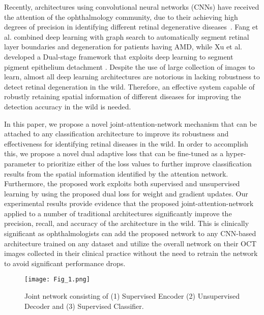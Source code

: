 \documentclass{article}
\begin{document}
Recently, architectures using convolutional neural networks (CNNs) have received the attention of the ophthalmology community, due to their achieving high degrees of precision in identifying different retinal degenerative diseases~\cite{lee2017deep}. Fang et al. combined deep learning with graph search to automatically segment retinal layer boundaries and degeneration for patients having AMD\cite{fang2017automatic}, while Xu et al. developed a Dual-stage framework that exploits deep learning to segment pigment epithelium detachment \cite{xu2017dual}. Despite the use of large collection of images to learn, almost all deep learning architectures are notorious in lacking robustness to detect retinal degeneration in the wild. Therefore, an effective system capable of robustly retaining spatial information of different diseases for improving the detection accuracy in the wild is needed. 

In this paper, we propose a novel joint-attention-network mechanism that can be attached to any classification architecture to improve its robustness and effectiveness for identifying retinal diseases in the wild. In order to accomplish this, we propose a novel dual adaptive loss that can be fine-tuned as a hyper-parameter to prioritize either of the loss values to further improve classification results from the spatial information identified by the attention network. Furthermore, the proposed work exploits both supervised and unsupervised learning by using the proposed dual loss for weight and gradient updates. Our experimental results provide evidence that the proposed joint-attention-network applied to a number of traditional architectures significantly improve the precision, recall, and accuracy of the architecture in the wild. This is clinically significant as ophthalmologists can add the proposed network to any CNN-based architecture trained on any dataset and utilize the overall network on their OCT images collected in their clinical practice without the need to retrain the network to avoid significant performance drops.

\begin{figure}[t]
    \centering
    \texttt{[image: Fig\_1.png]}
    \caption{Joint network consisting of (1) Supervised Encoder (2) Unsupervised Decoder and (3) Supervised Classifier.}\vspace{-.15in}
    \label{backbone_architecture}
\end{figure}
\end{document}
